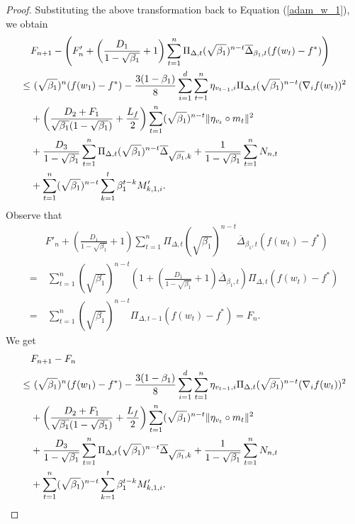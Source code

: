 \documentclass{article} %
\begin{document}
\begin{proof}
Substituting the above transformation back to Equation (\ref{adam_w_1}), we obtain
\begin{align*}
&F_{n+1}-\left(F'_{n}+\left(\frac{D_{1}}{1-\sqrt{\beta_{1}}}+1\right)\sum_{t=1}^{n}\Pi_{\Delta,t}(\sqrt{\beta_{1}})^{n-t}\overline{\Delta}_{\beta_{1},t}(f(w_{t})-f^*)\right)\notag\\\le&\ (\sqrt{\beta_{1}})^{n}(f(w_1)-f^*)-\frac{3(1-\beta_{1})}{8}\sum_{i=1}^{d}\sum_{t=1}^{n}\eta_{v_{t-1},i}\Pi_{\Delta,t}(\sqrt{\beta_{1}})^{n-t}(\nabla_{i}f(w_{t}))^{2}\notag\\&+\left(\frac{D_{2}+F_1}{\sqrt{\beta_{1}}(1-\sqrt{\beta_{1}})}+\frac{L_{f}}{2}\right)\sum_{t=1}^{n}(\sqrt{\beta_{1}})^{n-t}\|\eta_{v_{t}}\circ m_{t}\|^{2}\notag\\&+\frac{D_{3}}{1-\sqrt{\beta_{1}}}\sum_{t=1}^{n}\Pi_{\Delta,t}(\sqrt{\beta_{1}})^{n-t}\overline{\Delta}_{\sqrt{\beta_{1}},k}+\frac{{1}}{1-\sqrt{\beta_{1}}}\sum_{t=1}^{n}N_{n,t}\notag\\&+\sum_{t=1}^{n}(\sqrt{\beta_{1}})^{n-t}\sum_{k=1}^{t}\beta_{1}^{t-k}M_{k,1,i}'.  
\end{align*}
Observe that
\begin{align*}
& F'_{n}+\left(\frac{D_{1}}{1-\sqrt{\beta_{1}}}+1\right)\sum_{t=1}^{n}\Pi_{\Delta,t}(\sqrt{\beta_{1}})^{n-t}\overline{\Delta}_{\beta_{1},t}(f(w_{t})-f^*)\\=&\ \sum_{t=1}^{n}(\sqrt{\beta_{1}})^{n-t}\left(1+\left(\frac{D_{1}}{1-\sqrt{\beta_{1}}}+1\right)\overline{\Delta}_{\beta_{1},t}\right)\Pi_{\Delta,t}(f(w_{t})-f^*)\\=&\ \sum_{t=1}^{n}(\sqrt{\beta_{1}})^{n-t}\Pi_{\Delta,t-1}(f(w_{t})-f^*)=F_{n}.
\end{align*}
We get
\begin{align*}
&F_{n+1}-F_n\notag\\\le&\ (\sqrt{\beta_{1}})^{n}(f(w_1)-f^*)-\frac{3(1-\beta_{1})}{8}\sum_{i=1}^{d}\sum_{t=1}^{n}\eta_{v_{t-1},i}\Pi_{\Delta,t}(\sqrt{\beta_{1}})^{n-t}(\nabla_{i}f(w_{t}))^{2}\notag\\&+\left(\frac{D_{2}+F_1}{\sqrt{\beta_{1}}(1-\sqrt{\beta_{1}})}+\frac{L_{f}}{2}\right)\sum_{t=1}^{n}(\sqrt{\beta_{1}})^{n-t}\|\eta_{v_{t}}\circ m_{t}\|^{2}\notag\\&+\frac{D_{3}}{1-\sqrt{\beta_{1}}}\sum_{t=1}^{n}\Pi_{\Delta,t}(\sqrt{\beta_{1}})^{n-t}\overline{\Delta}_{\sqrt{\beta_{1}},k}+\frac{{1}}{1-\sqrt{\beta_{1}}}\sum_{t=1}^{n}N_{n,t}\notag\\&+\sum_{t=1}^{n}(\sqrt{\beta_{1}})^{n-t}\sum_{k=1}^{t}\beta_{1}^{t-k}M_{k,1,i}'.
\end{align*}

\end{proof}
\end{document}
